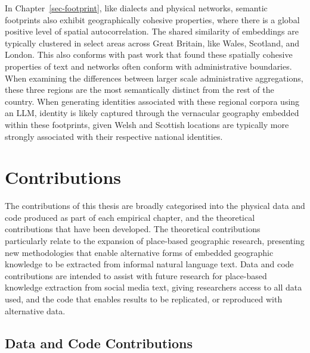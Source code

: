 \documentclass[
  letterpaper,
  11pt,
  english,
  onehalfspacing,
  headsepline]{MastersDoctoralThesis}
\begin{document}
In Chapter~\ref{sec-footprint}, like dialects and physical networks,
semantic footprints also exhibit geographically cohesive properties,
where there is a global positive level of spatial autocorrelation. The
shared similarity of embeddings are typically clustered in select areas
across Great Britain, like Wales, Scotland, and London. This also
conforms with past work that found these spatially cohesive properties
of text and networks often conform with administrative boundaries. When
examining the differences between larger scale administrative
aggregations, these three regions are the most semantically distinct
from the rest of the country. When generating identities associated with
these regional corpora using an LLM, identity is likely captured through
the vernacular geography embedded within these footprints, given Welsh
and Scottish locations are typically more strongly associated with their
respective national identities.

\hypertarget{sec-contributions}{%
\section{Contributions}\label{sec-contributions}}

The contributions of this thesis are broadly categorised into the
physical data and code produced as part of each empirical chapter, and
the theoretical contributions that have been developed. The theoretical
contributions particularly relate to the expansion of place-based
geographic research, presenting new methodologies that enable
alternative forms of embedded geographic knowledge to be extracted from
informal natural language text. Data and code contributions are intended
to assist with future research for place-based knowledge extraction from
social media text, giving researchers access to all data used, and the
code that enables results to be replicated, or reproduced with
alternative data.

\hypertarget{data-and-code-contributions}{%
\subsection{Data and Code
Contributions}\label{data-and-code-contributions}}
\end{document}
